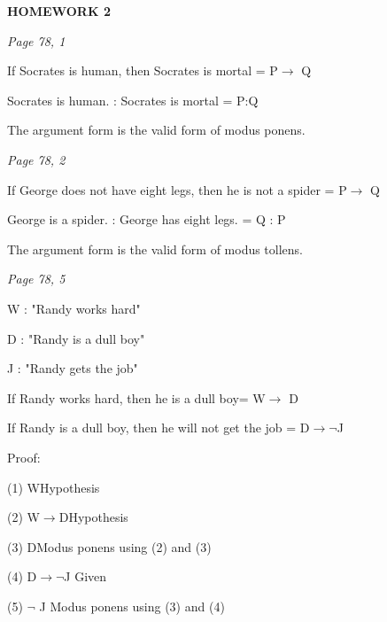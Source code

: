 \documentclass{article}
\begin{document}
\center\textbf{HOMEWORK 2}\par

\begin{flushleft}

\textit{Page 78, 1}\par
If Socrates is human, then Socrates is mortal = P\(\rightarrow\) Q\par
Socrates is human. : Socrates is mortal = P:Q\par
The argument form is the valid form of modus ponens.
\end{flushleft}


\begin{flushleft}
\textit{Page 78, 2}\par

If George does not have eight legs, then he is not a spider = P\(\rightarrow\) Q\par
George is a spider. : George has eight legs. = Q : P\par
The argument form is the valid form of modus tollens.

\end{flushleft}

\begin{flushleft}
\textit{Page 78, 5}\par
W : "Randy works hard" \par
D : "Randy is a dull boy" \par
J  : "Randy gets the job"\par
\vspace{0.25cm}
If Randy works hard, then he is a dull boy= W\(\rightarrow\) D \par
If Randy is a dull boy, then he will not get the job =  D\(\rightarrow\lnot\)J\par
\vspace{0.25cm}
Proof:

(1) W\hspace{2cm}Hypothesis\par
(2) W\(\rightarrow\)D\hspace{1.4cm}Hypothesis\par
(3) D\hspace{2.1cm}Modus ponens using (2) and (3)\par
(4) D\(\rightarrow\lnot\)J \hspace{1.15cm}Given\par
(5) \(\lnot\) J \hspace{1.75cm}Modus ponens using (3) and (4)

\end{flushleft}
\end{document}
